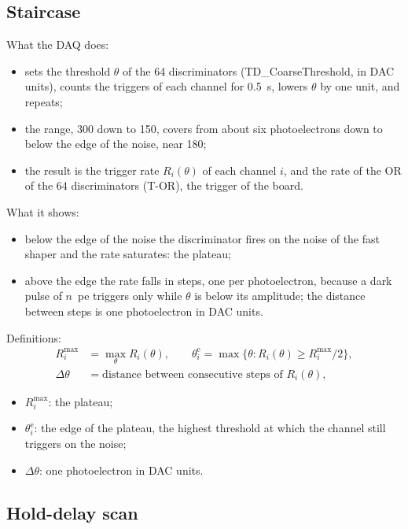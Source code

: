 \documentclass[11pt,a4paper]{article}
\begin{document}
\subsection{Staircase}

What the DAQ does:
\begin{itemize}
\item sets the threshold $\theta$ of the 64 discriminators (TD\_CoarseThreshold, in DAC
  units), counts the triggers of each channel for 0.5~s, lowers $\theta$ by one unit, and
  repeats;
\item the range, 300 down to 150, covers from about six photoelectrons down to below the
  edge of the noise, near 180;
\item the result is the trigger rate $R_i(\theta)$ of each channel $i$, and the rate of the
  OR of the 64 discriminators (T-OR), the trigger of the board.
\end{itemize}
What it shows:
\begin{itemize}
\item below the edge of the noise the discriminator fires on the noise of the fast shaper and
  the rate saturates: the plateau;
\item above the edge the rate falls in steps, one per photoelectron, because a dark pulse of
  $n$~pe triggers only while $\theta$ is below its amplitude; the distance between steps is
  one photoelectron in DAC units.
\end{itemize}
Definitions:
\begin{align*}
R_i^\mathrm{max} &= \max_\theta R_i(\theta), \qquad
\theta_i^\mathrm{e} = \max\{\theta : R_i(\theta) \ge R_i^\mathrm{max}/2\}, \\
\Delta\theta &= \text{distance between consecutive steps of } R_i(\theta),
\end{align*}
\begin{itemize}
\item $R_i^\mathrm{max}$: the plateau;
\item $\theta_i^\mathrm{e}$: the edge of the plateau, the highest threshold at which the
  channel still triggers on the noise;
\item $\Delta\theta$: one photoelectron in DAC units.
\end{itemize}

\subsection{Hold-delay scan}
\end{document}
